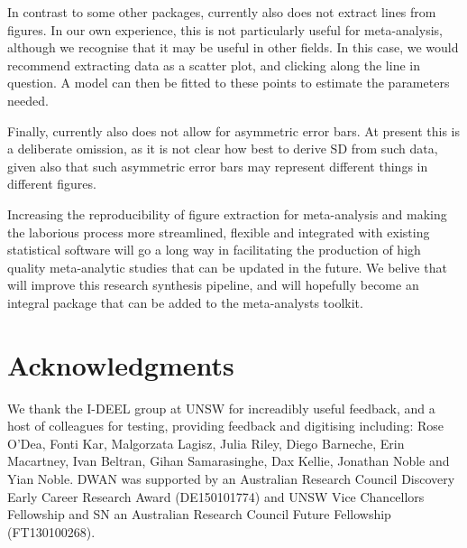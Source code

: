 \documentclass[article]{jss}
\begin{document}
In contrast to some other packages,  currently also does not extract lines from figures. In our own experience, this is not particularly useful for meta-analysis, although we recognise that it may be useful in other fields. In this case, we would recommend extracting data as a scatter plot, and clicking along the line in question. A model can then be fitted to these points to estimate the parameters needed.

Finally,  currently also does not allow for asymmetric error bars. At present this is a deliberate omission, as it is not clear how best to derive SD from such data, given also that such asymmetric error bars may represent different things in different figures. 

Increasing the reproducibility of figure extraction for meta-analysis and making the laborious process more streamlined, flexible and integrated with existing statistical software will go a long way in facilitating the production of high quality meta-analytic studies that can be updated in the future. We belive that  will improve this research synthesis pipeline, and will hopefully become an integral package that can be added to the meta-analysts toolkit.


\section*{Acknowledgments}
We thank the I-DEEL group at UNSW for increadibly useful feedback, and a host of colleagues for testing, providing feedback and digitising including: Rose O'Dea, Fonti Kar, Malgorzata Lagisz, Julia Riley, Diego Barneche, Erin Macartney, Ivan Beltran, Gihan Samarasinghe, Dax Kellie, Jonathan Noble and Yian Noble. DWAN was supported by an Australian Research Council Discovery Early Career Research Award (DE150101774) and UNSW Vice Chancellors Fellowship and SN an Australian Research Council Future Fellowship (FT130100268). 



\end{document}
